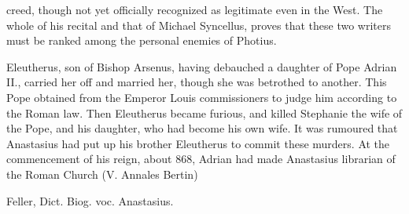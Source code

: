 creed, though not yet officially recognized as legitimate even in the West. The whole of his recital and that of Michael Syncellus, proves that these two writers must be ranked among the personal enemies of Photius.

Eleutherus, son of Bishop Arsenus, having debauched a daughter of Pope Adrian II., carried her off and married her, though she was betrothed to another. This Pope obtained from the Emperor Louis commissioners to judge him according to the Roman law. Then Eleutherus became furious, and killed Stephanie the wife of the Pope, and his daughter, who had become his own wife. It was rumoured that Anastasius had put up his brother Eleutherus to commit these murders. At the commencement of his reign, about 868, Adrian had made Anastasius librarian of the Roman Church (V. Annales Bertin)

Feller, Dict. Biog. voc. Anastasius.

